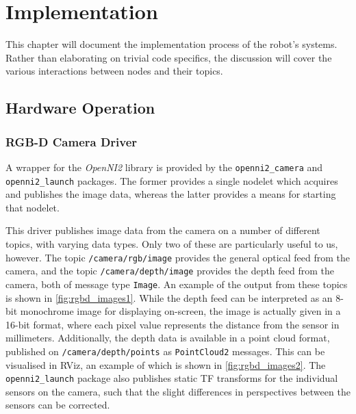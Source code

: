 \chapter{Implementation}
\label{chap:implementation}


This chapter will document the implementation process of the robot's systems. Rather than elaborating on trivial code specifics, the discussion will cover the various interactions between nodes and their topics.


\section{Hardware Operation}

\subsection{RGB-D Camera Driver}

A wrapper for the \emph{OpenNI2} library is provided by the \texttt{openni2\_camera} \cite{ros_wiki_openni2_camera} and \texttt{openni2\_launch} \cite{ros_wiki_openni2_launch} packages. The former provides a single nodelet which acquires and publishes the image data, whereas the latter provides a means for starting that nodelet.

This driver publishes image data from the camera on a number of different topics, with varying data types. Only two of these are particularly useful to us, however. The topic \texttt{/camera/rgb/image} provides the general optical feed from the camera, and the topic \texttt{/camera/depth/image} provides the depth feed from the camera, both of message type \texttt{Image}. An example of the output from these topics is shown in \autoref{fig:rgbd_images1}. While the depth feed can be interpreted as an 8-bit monochrome image for displaying on-screen, the image is actually given in a 16-bit format, where each pixel value represents the distance from the sensor in millimeters. Additionally, the depth data is available in a point cloud format, published on \texttt{/camera/depth/points} as \texttt{PointCloud2} messages. This can be visualised in RViz, an example of which is shown in \autoref{fig:rgbd_images2}. The \texttt{openni2\_launch} package also publishes static TF transforms for the individual sensors on the camera, such that the slight differences in perspectives between the sensors can be corrected.

